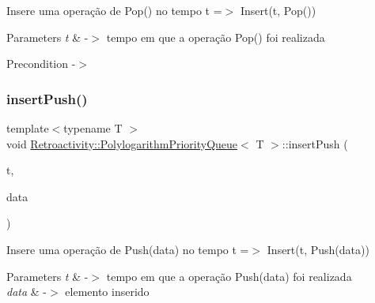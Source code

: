 Insere uma operação de Pop() no tempo t =$>$ Insert(t, Pop())


\begin{DoxyParams}{Parameters}
{\em t} & -\/$>$ tempo em que a operação Pop() foi realizada \\
\hline
\end{DoxyParams}
\begin{DoxyPrecond}{Precondition}
-\/$>$ 
\end{DoxyPrecond}
\mbox{\label{classRetroactivity_1_1PolylogarithmPriorityQueue_aa93c676dc292c42fc528ade916476b77}} 
\subsubsection{\texorpdfstring{insert\+Push()}{insertPush()}}
{\footnotesize\ttfamily template$<$typename T $>$ \\
void \hyperlink{classRetroactivity_1_1PolylogarithmPriorityQueue}{Retroactivity\+::\+Polylogarithm\+Priority\+Queue}$<$ T $>$\+::insert\+Push (\begin{DoxyParamCaption}\item[{int}]{t,  }\item[{T}]{data }\end{DoxyParamCaption})}

Insere uma operação de Push(data) no tempo t =$>$ Insert(t, Push(data))


\begin{DoxyParams}{Parameters}
{\em t} & -\/$>$ tempo em que a operação Push(data) foi realizada \\
\hline
{\em data} & -\/$>$ elemento inserido \\
\hline
\end{DoxyParams}
\mbox{\label{classRetroactivity_1_1PolylogarithmPriorityQueue_a464b4358858dcf25a9d4b2c4b3893218}} 

